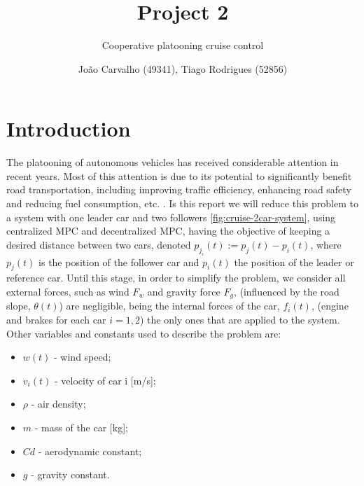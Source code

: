 \documentclass[a4paper,twocolumn]{article}
\title{Project 2}
\subtitle{Cooperative  platooning cruise control}
\author{ João Carvalho (49341), Tiago Rodrigues (52856)}
\begin{document}


\section{Introduction}

The platooning of autonomous vehicles has received considerable attention in recent years. Most of this attention is due to its potential to significantly benefit road transportation, including improving traffic efficiency, enhancing road safety and reducing fuel consumption, etc. \cite{Ding2012}. 
Is this report we will reduce this problem to a system with one leader car and two followers \ref{fig:cruise-2car-system}, using centralized MPC and decentralized MPC, having the objective of keeping a desired distance between two cars, denoted $p_j_i(t) := p_j(t) - p_i(t)$, where $p_j(t)$ is the position of the follower car and $p_i(t)$ the position of the leader or reference car.\cite{Guerreiro2022} 
Until this stage, in order to simplify the problem, we consider all external forces, such as wind $F_w$ and gravity force $F_g$, (influenced by the road slope, $\theta(t)$) are negligible, being the internal forces of the car, $f_i(t)$, (engine and brakes for each car $i=1,2$) the only ones that are applied to the system.
Other variables and constants used to describe the problem are: \cite{Guerreiro2022}
\begin{itemize}
  \item $w(t)$ - wind speed;
  \item $v_i(t)$ - velocity of car i [m/s];
  \item $\rho$ - air density;
  \item $m$ - mass of the car [kg];
  \item $Cd$ - aerodynamic constant;
  \item $g$ - gravity constant.
\end{itemize}
\end{document}
